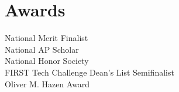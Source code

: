 \documentclass[]{deedy-resume}
\begin{document}
\begin{minipage}[t]{0.33\textwidth}

\section{Awards}
National Merit Finalist \\
National AP Scholar \\
National Honor Society \\
FIRST Tech Challenge Dean's List Semifinalist \\
Oliver M. Hazen Award \\
\sectionsep

%
%

\end{minipage} 
\hfill
\end{document}
